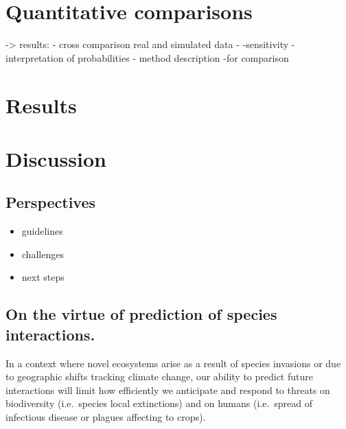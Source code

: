 \section{Quantitative comparisons}\label{quantitative-comparisons}

-\textgreater{} results: - cross comparison \textbar{} real and simulated data -
-sensitivity \textbar{} - interpretation of probabilities - method description
-for comparison

\section{Results}\label{results}

\section{Discussion}\label{discussion}

\subsection{Perspectives}\label{perspectives}

\begin{itemize} \item guidelines \item challenges \item next steps \end{itemize}

\subsection{On the virtue of prediction of species
interactions.}\label{on-the-virtue-of-prediction-of-species-interactions.}

In a context where novel ecosystems arise as a result of species invasions or
due to geographic shifts tracking climate change, our ability to predict future
interactions will limit how efficiently we anticipate and respond to threats on
biodiversity (i.e.~species local extinctions) and on humans (i.e.~spread of
infectious disease or plagues affecting to crops).

